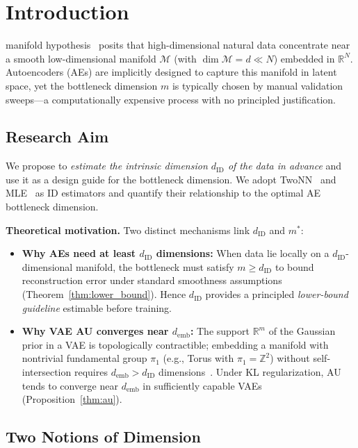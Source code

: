 \documentclass[lettersize,journal]{IEEEtran}
\newcommand{\dID}{d_{\mathrm{ID}}}
\newcommand{\R}{\mathbb{R}}
\newcommand{\demb}{d_{\mathrm{emb}}}
\begin{document}
\section{Introduction}\label{sec:intro}
 manifold hypothesis~\cite{fefferman2016manifold,bengio2013representation} posits that high-dimensional natural data concentrate near a smooth low-dimensional manifold $\mathcal{M}$ (with $\dim\mathcal{M} = d \ll N$) embedded in $\R^N$.
Autoencoders (AEs) are implicitly designed to capture this manifold in latent space, yet the bottleneck dimension $m$ is typically chosen by manual validation sweeps---a computationally expensive process with no principled justification.

\subsection{Research Aim}

We propose to \emph{estimate the intrinsic dimension $\dID$ of the data in advance} and use it as a design guide for the bottleneck dimension.
We adopt TwoNN~\cite{facco2017twonn} and MLE~\cite{levina2005mle} as ID estimators and quantify their relationship to the optimal AE bottleneck dimension.

\textbf{Theoretical motivation.}
Two distinct mechanisms link $\dID$ and $m^*$:
\begin{itemize}
  \item \textbf{Why AEs need at least $\dID$ dimensions:}
    When data lie locally on a $\dID$-dimensional manifold, the bottleneck must satisfy $m \geq \dID$ to bound reconstruction error under standard smoothness assumptions (Theorem~\ref{thm:lower_bound}).
    Hence $\dID$ provides a principled \emph{lower-bound guideline} estimable before training.
  \item \textbf{Why VAE AU converges near $\demb$:}
    The support $\R^m$ of the Gaussian prior in a VAE is topologically contractible; embedding a manifold with nontrivial fundamental group $\pi_1$ (e.g., Torus with $\pi_1 = \mathbb{Z}^2$) without self-intersection requires $\demb > \dID$ dimensions~\cite{hatcher2002algebraic}.
    Under KL regularization, AU tends to converge near $\demb$ in sufficiently capable VAEs (Proposition~\ref{thm:au}).
\end{itemize}

\subsection{Two Notions of Dimension}\label{sec:intro_dim}
\end{document}
